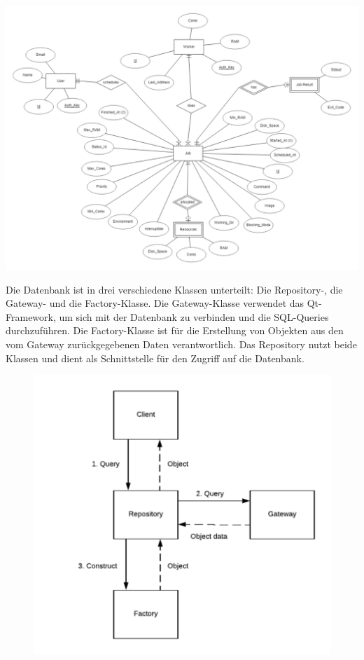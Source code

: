 \documentclass[a4paper,12pt]{article}
\begin{document}
\includegraphics[width=\textwidth]{database_relational}

\clearpage
Die Datenbank ist in drei verschiedene Klassen unterteilt: Die Repository-, die Gateway- und die Factory-Klasse. Die Gateway-Klasse verwendet das Qt-Framework, um sich mit der Datenbank zu verbinden und die SQL-Queries durchzuführen. Die Factory-Klasse ist für die Erstellung von Objekten aus den vom Gateway zurückgegebenen Daten verantwortlich. Das Repository nutzt beide Klassen und dient als Schnittstelle für den Zugriff auf die Datenbank.\newline


\begin{figure}
\includegraphics[width=\textwidth]{high_lvl_repository}
\end{figure}
\end{document}
